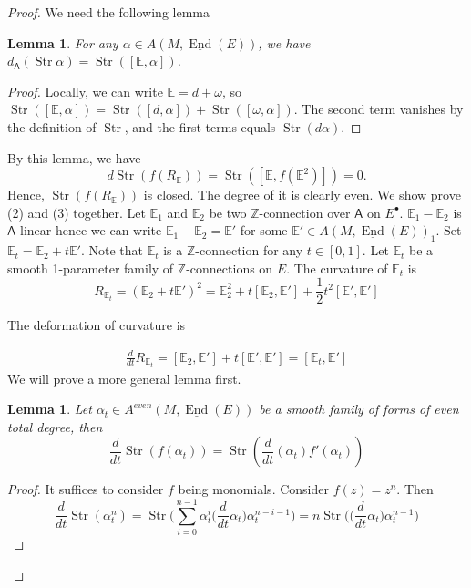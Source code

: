 \documentclass[12pt]{amsart}
\newtheorem{lem}[thm]{Lemma}
\theoremstyle{definition}
\theoremstyle{remark}
\numberwithin{equation}{section}
\newcommand{\Z}{{\mathbb{Z}}}
\newcommand{\1}{{\mathbb{1}}}
\newcommand{\End}{\operatorname{End}}
\newcommand{\str}{\operatorname{Str}}
\begin{document}
\begin{proof}

We need the following lemma
\begin{lem}
For any $\alpha \in A(M, \underline{\End}(E))$, we have $d_{\mathsf{A}}(\str \alpha) = \str([\mathbb{E}, \alpha])$.
\end{lem}
\begin{proof}
Locally, we can write $\mathbb{E} = d + \omega$, so $\str([\mathbb{E}, \alpha]) = \str([d, \alpha]) + \str([\omega, \alpha])$. The second term vanishes by the definition of $\str$, and the first terms equals $\str(d\alpha)$.
\end{proof}
By this lemma, we have 
\begin{equation*}
    d \str(f(R_{\mathbb{E}})) = \str([\mathbb{E}, f(\mathbb{E}^2)]) = 0.
\end{equation*}
Hence, $\str(f(R_{\mathbb{E}}))$ is closed. The degree of it is clearly even.
We show prove (2) and (3) together. 
Let $\mathbb{E}_1$ and $\mathbb{E}_2$ be two $\Z$-connection over $\mathsf{A}$ on $E^{\bullet}$. $\mathbb{E}_1 -\mathbb{E}_2  $ is $\mathsf{A}$-linear hence we can write $\mathbb{E}_1 -\mathbb{E}_2 = \mathbb{E}'$ for some $\mathbb{E}' \in A(M, \underline{\End}(E))_1$. Set $\mathbb{E}_t = \mathbb{E}_2 + t \mathbb{E}'$. Note that $\mathbb{E}_t$ is a $\Z$-connection for any $t \in [0, 1]$. 
Let $\mathbb{E}_t$ be a smooth 1-parameter family of $\Z$-connections on $E$. The curvature of $\mathbb{E}_t$ is 
\begin{equation*}
    R_{\mathbb{E}_t} = (\mathbb{E}_2 + t \mathbb{E}')^2 = \mathbb{E}_2^2 + t[\mathbb{E}_2, \mathbb{E}'] + \frac{1}{2}t^2[\mathbb{E}', \mathbb{E}']
\end{equation*}

The deformation of curvature is

\begin{align*}
    \frac{d}{dt}R_{\mathbb{E}_t} = [\mathbb{E}_2, \mathbb{E}'] + t[\mathbb{E}', \mathbb{E}'] = [\mathbb{E}_t, \mathbb{E}']
\end{align*}
We will prove a more general lemma first.
\begin{lem}
Let $\alpha_t \in A^{even}(M, \underline{\End}(E))$ be a smooth family of forms of even total degree, then
\begin{equation*}
    \frac{d}{dt} \str(f(\alpha_t)) = \str(\frac{d}{dt}(\alpha_t) f'(\alpha_t))
\end{equation*}
\end{lem}
\begin{proof}
It suffices to consider $f$ being monomials. Consider $f(z) = z^n$. Then
\begin{equation*}
    \frac{d}{dt} \str(\alpha_t^n) = \str\Big(\sum_{i = 0}^{n - 1}\alpha_t^i\Big(\frac{d}{dt}\alpha_t\Big)\alpha_t^{n - i - 1} \Big) = n \str
    \Big(\Big(\frac{d}{dt}\alpha_t\Big)\alpha_t^{n- 1}\Big)
\end{equation*}



\end{proof}
\end{proof}
\end{document}
